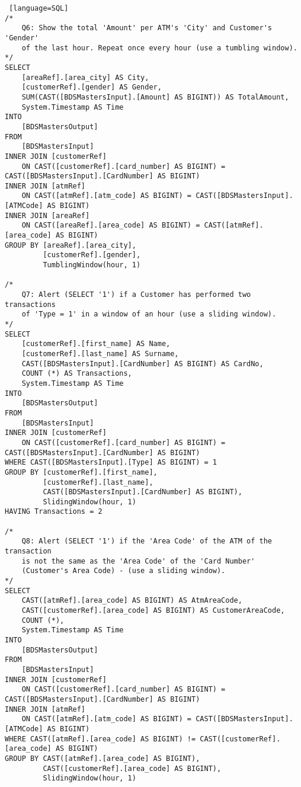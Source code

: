 \documentclass[11pt]{article}
\begin{document}
\begin{lstlisting} [language=SQL]
/*
    Q6: Show the total 'Amount' per ATM's 'City' and Customer's 'Gender' 
    of the last hour. Repeat once every hour (use a tumbling window).
*/
SELECT
    [areaRef].[area_city] AS City,
    [customerRef].[gender] AS Gender,
    SUM(CAST([BDSMastersInput].[Amount] AS BIGINT)) AS TotalAmount,
    System.Timestamp AS Time
INTO
    [BDSMastersOutput]
FROM
    [BDSMastersInput]
INNER JOIN [customerRef]
    ON CAST([customerRef].[card_number] AS BIGINT) = CAST([BDSMastersInput].[CardNumber] AS BIGINT)
INNER JOIN [atmRef]
    ON CAST([atmRef].[atm_code] AS BIGINT) = CAST([BDSMastersInput].[ATMCode] AS BIGINT)
INNER JOIN [areaRef]
    ON CAST([areaRef].[area_code] AS BIGINT) = CAST([atmRef].[area_code] AS BIGINT)
GROUP BY [areaRef].[area_city],
         [customerRef].[gender],
         TumblingWindow(hour, 1)

/*
    Q7: Alert (SELECT '1') if a Customer has performed two transactions
    of 'Type = 1' in a window of an hour (use a sliding window).
*/
SELECT
    [customerRef].[first_name] AS Name,
    [customerRef].[last_name] AS Surname,
    CAST([BDSMastersInput].[CardNumber] AS BIGINT) AS CardNo,
    COUNT (*) AS Transactions,
    System.Timestamp AS Time
INTO
    [BDSMastersOutput]
FROM
    [BDSMastersInput]
INNER JOIN [customerRef]
    ON CAST([customerRef].[card_number] AS BIGINT) = CAST([BDSMastersInput].[CardNumber] AS BIGINT)
WHERE CAST([BDSMastersInput].[Type] AS BIGINT) = 1
GROUP BY [customerRef].[first_name],
         [customerRef].[last_name],
         CAST([BDSMastersInput].[CardNumber] AS BIGINT),
         SlidingWindow(hour, 1)
HAVING Transactions = 2

/*
    Q8: Alert (SELECT '1') if the 'Area Code' of the ATM of the transaction 
    is not the same as the 'Area Code' of the 'Card Number' 
    (Customer's Area Code) - (use a sliding window).
*/
SELECT
    CAST([atmRef].[area_code] AS BIGINT) AS AtmAreaCode,
    CAST([customerRef].[area_code] AS BIGINT) AS CustomerAreaCode,
    COUNT (*),
    System.Timestamp AS Time
INTO
    [BDSMastersOutput]
FROM
    [BDSMastersInput]
INNER JOIN [customerRef]
    ON CAST([customerRef].[card_number] AS BIGINT) = CAST([BDSMastersInput].[CardNumber] AS BIGINT)
INNER JOIN [atmRef]
    ON CAST([atmRef].[atm_code] AS BIGINT) = CAST([BDSMastersInput].[ATMCode] AS BIGINT)
WHERE CAST([atmRef].[area_code] AS BIGINT) != CAST([customerRef].[area_code] AS BIGINT)
GROUP BY CAST([atmRef].[area_code] AS BIGINT),
         CAST([customerRef].[area_code] AS BIGINT), 
         SlidingWindow(hour, 1)

\end{lstlisting}
\end{document}
